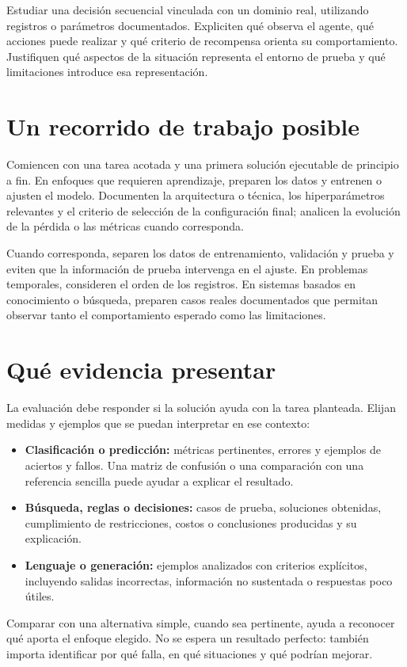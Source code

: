 \documentclass[11pt,a4paper]{article}
\begin{document}
Estudiar una decisión secuencial vinculada con un dominio real, utilizando registros o parámetros documentados. Expliciten qué observa el agente, qué acciones puede realizar y qué criterio de recompensa orienta su comportamiento. Justifiquen qué aspectos de la situación representa el entorno de prueba y qué limitaciones introduce esa representación.

\newpage
{}

\section*{Un recorrido de trabajo posible}
Comiencen con una tarea acotada y una primera solución ejecutable de principio a fin. En enfoques que requieren aprendizaje, preparen los datos y entrenen o ajusten el modelo. Documenten la arquitectura o técnica, los hiperparámetros relevantes y el criterio de selección de la configuración final; analicen la evolución de la pérdida o las métricas cuando corresponda.

Cuando corresponda, separen los datos de entrenamiento, validación y prueba y eviten que la información de prueba intervenga en el ajuste. En problemas temporales, consideren el orden de los registros. En sistemas basados en conocimiento o búsqueda, preparen casos reales documentados que permitan observar tanto el comportamiento esperado como las limitaciones.

\section*{Qué evidencia presentar}
La evaluación debe responder si la solución ayuda con la tarea planteada. Elijan medidas y ejemplos que se puedan interpretar en ese contexto:
\begin{itemize}
\item \textbf{Clasificación o predicción:} métricas pertinentes, errores y ejemplos de aciertos y fallos. Una matriz de confusión o una comparación con una referencia sencilla puede ayudar a explicar el resultado.
\item \textbf{Búsqueda, reglas o decisiones:} casos de prueba, soluciones obtenidas, cumplimiento de restricciones, costos o conclusiones producidas y su explicación.
\item \textbf{Lenguaje o generación:} ejemplos analizados con criterios explícitos, incluyendo salidas incorrectas, información no sustentada o respuestas poco útiles.
\end{itemize}
Comparar con una alternativa simple, cuando sea pertinente, ayuda a reconocer qué aporta el enfoque elegido. No se espera un resultado perfecto: también importa identificar por qué falla, en qué situaciones y qué podrían mejorar.
\end{document}
